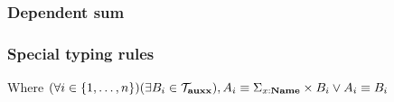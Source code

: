 \documentclass[a4paper]{article}
\begin{document}
\subsubsection{Dependent sum}

\begin{minipage}{0.8\textwidth}
  \begin{flushleft}
    \begin{prooftree}
    \end{prooftree}

    \begin{prooftree}
    \end{prooftree}
  \end{flushleft}
\end{minipage}
\begin{minipage}{0.2\textwidth}
  \begin{flushright}
    \begin{prooftree}
    \end{prooftree}

    \begin{prooftree}
    \end{prooftree}
  \end{flushright}
\end{minipage}

\subsubsection{Special typing rules}

\begin{prooftree}
\end{prooftree}

Where $(\forall i \in \{ 1, \dots, n \}) (\exists B_i \in \mathcal{T}_{\bf auxx}), A_i \equiv \Sigma_{x : {\bf Name}} \times B_i \vee A_i \equiv B_i$
\end{document}
